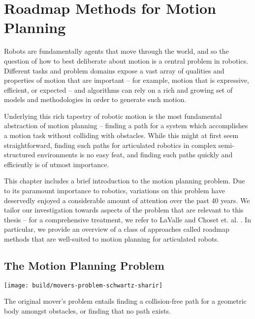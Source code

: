 \chapter{Roadmap Methods for Motion Planning}
\label{chap:roadmaps}

Robots are fundamentally agents that move through the world,
and so the question of how to best deliberate about motion
is a central problem in robotics.
Different tasks and problem domains expose a vast array of
qualities and properties of motion that are important
-- for example, motion that is expressive, efficient, or expected
-- and algorithms can rely on a rich and growing set
of models and methodologies in order to generate such motion.

Underlying this rich tapestry of robotic motion
is the most fundamental abstraction of motion planning --
finding a path for a system which accomplishes a motion task
without colliding with obstacles.
While this might at first seem straightforward,
finding such paths for articulated robotics in
complex semi-structured environments
is no easy feat,
and finding such paths quickly and efficiently
is of utmost importance.

This chapter includes a brief introduction to
the motion planning problem.
Due to its paramount importance to robotics,
variations on this problem have deservedly
enjoyed a considerable amount of attention over the past 40 years.
We tailor our investigation towards aspects of the problem
that are relevant to this thesis
-- for a comprehensive treatment,
we refer to LaValle \citep{lavalle2006planningbook}
and Choset et. al. \citep{choset2005robotmotion}.
In particular,
we provide an overview of a class of approaches called roadmap methods
that are well-suited to motion planning for articulated robots.

\section{The Motion Planning Problem}

\begin{marginfigure}
   \centering
   \texttt{[image: build/movers-problem-schwartz-sharir]} %
   \caption[The original mover's problem
      entails finding a collision-free path for a geometric body
      amongst obstacles,
      or finding that no path exists.
   ]{The original mover's problem
      \citep{schwartzsharir1983pianomovers1}
      entails finding a collision-free path for a geometric body
      amongst obstacles,
      or finding that no path exists.}
   \label{fig:roadmaps:movers}
\end{marginfigure}

